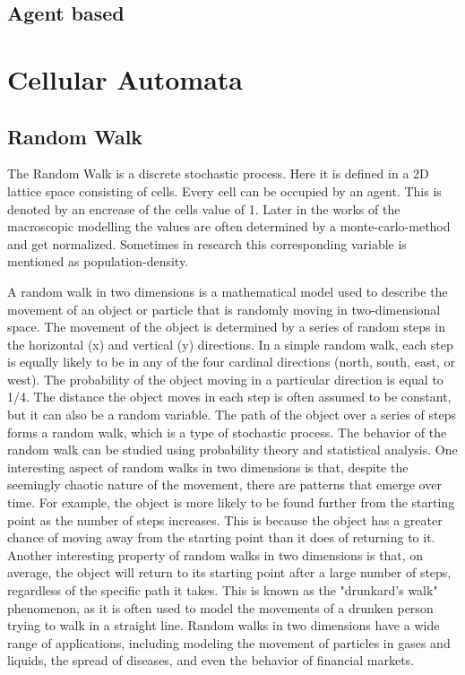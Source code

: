 \subsection{Agent based}


\newpage
\section{Cellular Automata}
\subsection{Random Walk}
The Random Walk is a discrete stochastic process. Here it is defined in a 2D lattice space consisting of cells. Every cell can be occupied by an agent. 
This is denoted by an encrease of the cells value of 1. 
Later in the works of the macroscopic modelling the values are often determined by a monte-carlo-method and get normalized. 
Sometimes in research this corresponding variable is mentioned as population-density.

A random walk in two dimensions is a mathematical model used to describe the movement of an object or particle that is randomly moving in two-dimensional space. 
The movement of the object is determined by a series of random steps in the horizontal (x) and vertical (y) directions.
In a simple random walk, each step is equally likely to be in any of the four cardinal directions (north, south, east, or west). 
The probability of the object moving in a particular direction is equal to 1/4. The distance the object moves in each step is often assumed to be constant, 
but it can also be a random variable.
The path of the object over a series of steps forms a random walk, which is a type of stochastic process. The behavior of the random walk 
can be studied using probability theory and statistical analysis.
One interesting aspect of random walks in two dimensions is that, despite the seemingly chaotic nature of the movement, there are patterns that emerge over time. 
For example, the object is more likely to be found further from the starting point as the number of steps increases. 
This is because the object has a greater chance of moving away from the starting point than it does of returning to it.
Another interesting property of random walks in two dimensions is that, on average, the object will return to its starting point after a large number of steps, 
regardless of the specific path it takes. This is known as the "drunkard's walk" phenomenon, as it is often used to model the movements of a drunken person trying to walk in a straight line.
Random walks in two dimensions have a wide range of applications, including modeling the movement of particles in gases and liquids, 
the spread of diseases, and even the behavior of financial markets.

